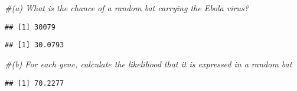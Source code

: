 \documentclass[
]{article}
\newenvironment{Shaded}{\begin{snugshade}}{\end{snugshade}}
\newcommand{\CommentTok}[1]{\textcolor[rgb]{0.56,0.35,0.01}{\textit{#1}}}
\newcommand{\DecValTok}[1]{\textcolor[rgb]{0.00,0.00,0.81}{#1}}
\newcommand{\FloatTok}[1]{\textcolor[rgb]{0.00,0.00,0.81}{#1}}
\newcommand{\FunctionTok}[1]{\textcolor[rgb]{0.13,0.29,0.53}{\textbf{#1}}}
\newcommand{\NormalTok}[1]{#1}
\newcommand{\SpecialCharTok}[1]{\textcolor[rgb]{0.81,0.36,0.00}{\textbf{#1}}}
\newcommand{\StringTok}[1]{\textcolor[rgb]{0.31,0.60,0.02}{#1}}
\begin{document}
\begin{Shaded}
\begin{Highlighting}[]
\CommentTok{\#(a) What is the chance of a random bat carrying the Ebola virus?}
\end{Highlighting}
\end{Shaded}

\begin{Shaded}
\end{Shaded}

\begin{verbatim}
## [1] 30079
\end{verbatim}

\begin{Shaded}
\end{Shaded}

\begin{verbatim}
## [1] 30.0793
\end{verbatim}

\begin{Shaded}
\begin{Highlighting}[]
\CommentTok{\#(b) For each gene, calculate the likelihood that it is expressed in a random bat}
\end{Highlighting}
\end{Shaded}

\begin{Shaded}
\end{Shaded}

\begin{verbatim}
## [1] 70.2277
\end{verbatim}

\begin{Shaded}
\end{Shaded}
\end{document}
